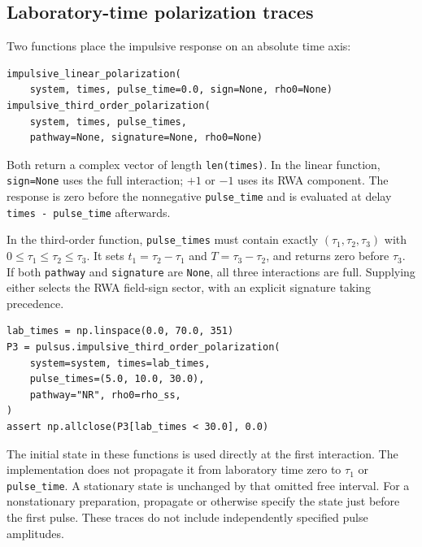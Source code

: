 \subsection{Laboratory-time polarization traces}

Two functions place the impulsive response on an absolute time axis:
\par\noindent
\begin{minipage}{\linewidth}
\begin{lstlisting}[style=python]
impulsive_linear_polarization(
    system, times, pulse_time=0.0, sign=None, rho0=None)
impulsive_third_order_polarization(
    system, times, pulse_times,
    pathway=None, signature=None, rho0=None)
\end{lstlisting}
\end{minipage}\par
Both return a complex vector of length \texttt{len(times)}. In the linear
function, \texttt{sign=None} uses the full interaction; $+1$ or $-1$ uses
its RWA component. The response is zero before the nonnegative
\texttt{pulse\_time} and is evaluated at delay
\texttt{times - pulse\_time} afterwards.

In the third-order function, \texttt{pulse\_times} must contain exactly
$(\tau_1,\tau_2,\tau_3)$ with
$0\leq\tau_1\leq\tau_2\leq\tau_3$. It sets
$t_1=\tau_2-\tau_1$ and $T=\tau_3-\tau_2$, and returns zero before
$\tau_3$. If both \texttt{pathway} and \texttt{signature} are
\texttt{None}, all three interactions are full. Supplying either
selects the RWA field-sign sector, with an explicit signature taking
precedence.

\par\noindent
\begin{minipage}{\linewidth}
\begin{lstlisting}[style=python]
lab_times = np.linspace(0.0, 70.0, 351)
P3 = pulsus.impulsive_third_order_polarization(
    system=system, times=lab_times,
    pulse_times=(5.0, 10.0, 30.0),
    pathway="NR", rho0=rho_ss,
)
assert np.allclose(P3[lab_times < 30.0], 0.0)
\end{lstlisting}
\end{minipage}\par
The initial state in these functions is used directly at the first
interaction. The implementation does not propagate it from laboratory
time zero to $\tau_1$ or \texttt{pulse\_time}. A stationary state is
unchanged by that omitted free interval. For a nonstationary preparation,
propagate or otherwise specify the state just before the first pulse.
These traces do not include independently specified pulse amplitudes.

